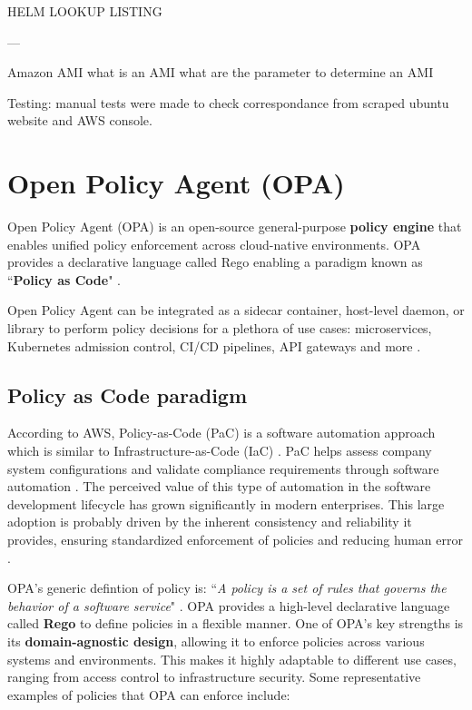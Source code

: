 HELM LOOKUP LISTING



---

Amazon
AMI
what is an AMI
what are the parameter to determine an AMI

Testing:
manual tests were made to check correspondance from scraped ubuntu website and AWS console.


\newpage

\section{Open Policy Agent (OPA)}

Open Policy Agent (OPA) is an open-source general-purpose \textbf{policy engine} that enables unified policy enforcement across cloud-native environments. OPA provides a declarative language called Rego enabling a paradigm known as ``\textbf{Policy as Code}" \cite{opa_docs}.

Open Policy Agent can be integrated as a sidecar container, host-level daemon, or library to perform policy decisions for a plethora of use cases: microservices, Kubernetes admission control, CI/CD pipelines,  API gateways and more \cite{opa_docs}. 

\subsection{Policy as Code paradigm}

According to AWS, Policy-as-Code (PaC) is a software automation approach which is similar to Infrastructure-as-Code (IaC) \cite{pac_aws}. PaC helps assess company system configurations and validate compliance requirements through software automation \cite{pac_aws}. The perceived value of this type of automation in the software development lifecycle has grown significantly in modern enterprises. This large adoption is probably driven by the inherent consistency and reliability it provides, ensuring standardized enforcement of policies and reducing human error \cite{pac_aws}.

OPA's generic defintion of policy is: ``\textit{A policy is a set of rules that governs the behavior of a software service}" \cite{opa_philosophy}. OPA provides a high-level declarative language called \textbf{Rego} to define policies in a flexible manner. One of OPA's key strengths is its \textbf{domain-agnostic design}, allowing it to enforce policies across various systems and environments. This makes it highly adaptable to different use cases, ranging from access control to infrastructure security. Some representative examples of policies that OPA can enforce include:

